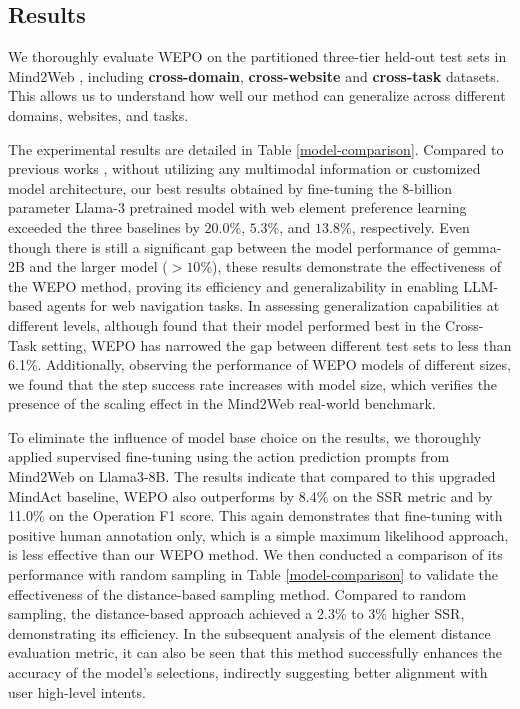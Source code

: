 \documentclass{article}
\begin{document}
  \subsection{Results}
  
  
  We thoroughly evaluate WEPO on the partitioned three-tier held-out test sets in Mind2Web \citep{deng2024mind2web}, including \textbf{cross-domain}, \textbf{cross-website} and \textbf{cross-task} datasets. This allows us to understand how well our method can generalize across different domains, websites, and tasks.
  
  The experimental results are detailed in Table \ref{model-comparison}. Compared to previous works \citep{deng2024mind2web,hong2023cogagent,gur2023real}, without utilizing any multimodal information or customized model architecture, our best results obtained by fine-tuning the 8-billion parameter Llama-3 pretrained model with web element preference learning exceeded the three baselines by $20.0\%$, $5.3\%$, and $13.8\%$, respectively. Even though there is still a significant gap between the model performance of gemma-2B and the larger model ($>10\%$), these results demonstrate the effectiveness of the WEPO method, proving its efficiency and generalizability in enabling LLM-based agents for web navigation tasks. In assessing generalization capabilities at different levels, although \citet{deng2024mind2web} found that their model performed best in the Cross-Task setting, WEPO has narrowed the gap between different test sets to less than 6.1\%. Additionally, observing the performance of WEPO models of different sizes, we found that the step success rate increases with model size, which verifies the presence of the scaling effect in the Mind2Web real-world benchmark.
  
  To eliminate the influence of model base choice on the results, we thoroughly applied supervised fine-tuning using the action prediction prompts from Mind2Web on Llama3-8B. The results indicate that compared to this upgraded MindAct baseline, WEPO also outperforms by 8.4\% on the SSR metric and by 11.0\% on the Operation F1 score. This again demonstrates that fine-tuning with positive human annotation only, which is a simple maximum likelihood approach, is less effective than our WEPO method. We then conducted a comparison of its performance with random sampling in Table \ref{model-comparison} to validate the effectiveness of the distance-based sampling method. Compared to random sampling, the distance-based approach achieved a 2.3\% to 3\% higher SSR, demonstrating its efficiency. In the subsequent analysis of the element distance evaluation metric, it can also be seen that this method successfully enhances the accuracy of the model's selections, indirectly suggesting better alignment with user high-level intents.
  
\end{document}
